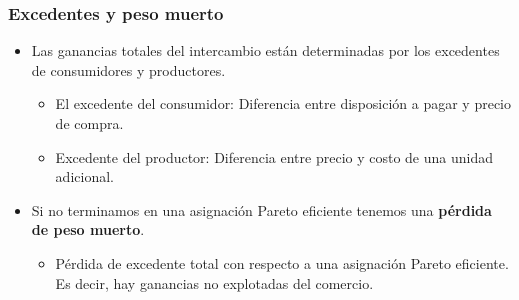 \documentclass{beamer}
\begin{document}
\begin{frame}
    \frametitle{Excedentes y peso muerto}
    \begin{itemize}
        \item Las ganancias totales del intercambio están determinadas por los excedentes de consumidores y productores.
        \begin{itemize}
            \item El excedente del consumidor: Diferencia entre disposición a pagar y precio de compra.  
            \item Excedente del productor: Diferencia entre precio y costo de una unidad adicional.
        \end{itemize}
        \item Si no terminamos en una asignación Pareto eficiente tenemos una \textbf{pérdida de peso muerto}.
        \begin{itemize}
            \item Pérdida de excedente total con respecto a una asignación Pareto eficiente. Es decir, hay ganancias no explotadas del comercio.
        \end{itemize}
    \end{itemize}
\end{frame}
\end{document}
